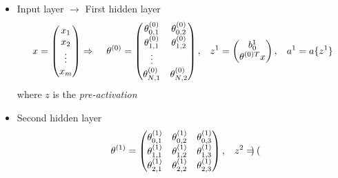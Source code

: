 \documentclass[a4paper,10pt]{article}
\begin{document}
\begin{itemize}
    \item Input layer $\rightarrow$ First hidden layer
        \begin{gather*}
            x  = 
            \begin{pmatrix}
                x_{1} \\
                x_{2} \\
                \vdots \\
                x_{m} \\
            \end{pmatrix}
            \Rightarrow\hspace*{0.4cm}\theta^{(0)} = 
            \begin{pmatrix}
                \theta_{0,1}^{(0)} & \theta_{0,2}^{(0)}  \\
                \theta_{1,1}^{(0)} & \theta_{1,2}^{(0)}  \\
                \vdots \\
                \theta_{N,1}^{(0)} & \theta_{N,2}^{(0)}  \\
              \end{pmatrix}
              ,\hspace*{0.3cm}
              z^1 = 
              \begin{pmatrix}
                b_0^1 \\
                \theta^{(0)T}x \\
              \end{pmatrix}
              ,\hspace*{0.3cm}
              a^1 = a\{z^1\} 
        \end{gather*}
    where $z$ is the \textit{pre-activation}
    \item Second hidden layer 
        \begin{gather*}
        \theta^{(1)} =
            \begin{pmatrix}
                \theta_{0,1}^{(1)} & \theta_{0,2}^{(1)} & \theta_{0,3}^{(1)}  \\
                \theta_{1,1}^{(1)} & \theta_{1,2}^{(1)} & \theta_{1,3}^{(1)} \\
                \theta_{2,1}^{(1)} & \theta_{2,2}^{(1)} & \theta_{2,3}^{(1)} \\
            \end{pmatrix}
            ,\hspace*{0.3cm}
            z^2 = 
            \begin{pmatrix}

\end{pmatrix}
\end{gather*}
\end{itemize}
\end{document}
